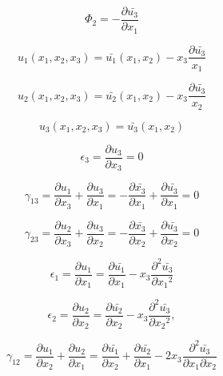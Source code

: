 		\begin{equation}
		  \Phi_2 = - \frac{\partial \bar{u_3}}{\partial x_1}
		\end{equation}

		\begin{equation}
		  u_1(x_1, x_2, x_3) = \bar{u_1}(x_1, x_2) - x_3 \frac{\partial \bar{u_3}}{x_1}
		\end{equation}

		\begin{equation}
		  u_2(x_1, x_2, x_3) = \bar{u_2}(x_1, x_2) - x_3 \frac{\partial \bar{u_3}}{x_2}
		\end{equation}

		\begin{equation}
		  u_3(x_1, x_2, x_3) = \bar{u_3}(x_1, x_2)
		\end{equation}

		\begin{equation}
		  \epsilon_3 = \frac{\partial u_3}{\partial x_3} = 0
		\end{equation}

		\begin{equation}
		  \gamma_{13} = \frac{\partial u_1}{\partial x_3} + \frac{\partial u_3}{\partial x_1} = - \frac{\partial \bar{x_3}}{\partial x_1} + \frac{\partial \bar{u_3}}{\partial x_1} = 0
		\end{equation}

		\begin{equation}
		  \gamma_{23} = \frac{\partial u_2}{\partial x_3} + \frac{\partial{u_3}}{\partial{x_2}} = - \frac{\partial \bar{x_3}}{\partial{x_2}
		  } + \frac{\partial{\bar{u_3}}}{\partial{x_2}} = 0
		\end{equation}

		\begin{equation}
		  \epsilon_1 = \frac{\partial{u_1}}{\partial{x_1}} = \frac{\partial{\bar{u_1}}}{\partial{x_1}} - x_3 \frac{\partial^2 \bar{u_3}}{\partial{x_1}^2}
		\end{equation}
		  
		\begin{equation}
		  \epsilon_2 = \frac{\partial{u_2}}{\partial{x_2}} = \frac{\partial{\bar{u_2}}}{\partial{x_2}} - x_3 \frac{\partial^2 \bar{u_3}}{\partial{x_2}^2},
		\end{equation}

		\begin{equation}
		  \gamma_{12} = \frac{\partial{u_1}}{\partial{x_2}} + \frac{\partial{u_2}}{\partial{x_1}} = \frac{\partial{\bar{u_1}}}{\partial{x_2}} + \frac{\partial{\bar{u_2}}}{\partial{x_1}} - 2x_3\frac{\partial^2 \bar{u_3}}{\partial{x_1}\partial{x_2}}
		\end{equation}

